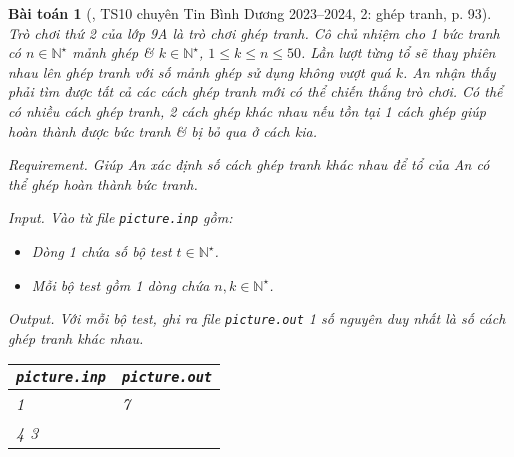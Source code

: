 \documentclass{article}
\newtheorem{baitoan}{Bài toán}
\begin{document}
\begin{baitoan}[\cite{Trung_THCS_Tin}, TS10 chuyên Tin Bình Dương 2023--2024, 2: ghép tranh, p. 93]
	Trò chơi thứ 2 của lớp 9A là trò chơi ghép tranh. Cô chủ nhiệm cho 1 bức tranh có $n\in\mathbb{N}^\star$ mảnh ghép \& $k\in\mathbb{N}^\star$, $1\le k\le n\le50$. Lần lượt từng tổ sẽ thay phiên nhau lên ghép tranh với số mảnh ghép sử dụng không vượt quá $k$. An nhận thấy phải tìm được tất cả các cách ghép tranh mới có thể chiến thắng trò chơi. Có thể có nhiều cách ghép tranh, 2 cách ghép khác nhau nếu tồn tại 1 cách ghép giúp hoàn thành được bức tranh \& bị bỏ qua ở cách kia.
	\item {\sf Requirement.} Giúp An xác định số cách ghép tranh khác nhau để tổ của An có thể ghép hoàn thành bức tranh.
	\item {\sf Input.} Vào từ file {\tt picture.inp} gồm:
	\begin{itemize}
		\item Dòng 1 chứa số bộ test $t\in\mathbb{N}^\star$.
		\item Mỗi bộ test gồm 1 dòng chứa $n,k\in\mathbb{N}^\star$.
	\end{itemize}
	\item {\sf Output.} Với mỗi bộ test, ghi ra file {\tt picture.out} 1 số nguyên duy nhất là số cách ghép tranh khác nhau.
	\begin{table}[H]
		\centering
		\begin{tabular}{|l|l|}
			\hline
			{\tt picture.inp} & {\tt picture.out} \\
			\hline
			1 & 7 \\
			4 3 & \\
			\hline
		\end{tabular}
	\end{table}
\end{baitoan}
\end{document}
